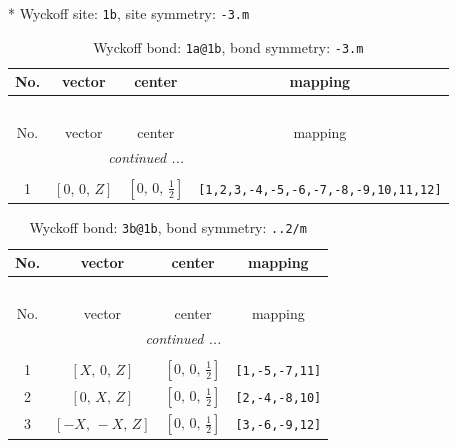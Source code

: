 \documentclass[fleqn,8pt]{jsarticle}
\begin{document}
* Wyckoff site: {\tt 1b}, site symmetry: {\tt -3.m}
\renewcommand{\arraystretch}{1.2}
\begin{longtable}{cccc}
\caption{Wyckoff bond: {\tt 1a@1b}, bond symmetry: {\tt -3.m}}
 \\
 \hline \hline
No. & vector & center & mapping \\ \hline \endfirsthead

\multicolumn{3}{l}{\tablename\ \thetable{}} \\
 \hline \hline
No. & vector & center & mapping \\ \hline \endhead

 \hline \hline
\multicolumn{3}{r}{\footnotesize\it continued ...} \\ \endfoot

 \hline \hline
\multicolumn{3}{r}{} \\ \endlastfoot

1 & $\left[ 0,\, 0,\, Z \right]$ & $\left[ 0,\, 0,\, \frac{1}{2} \right]$ & {\tt [1,2,3,-4,-5,-6,-7,-8,-9,10,11,12]} \\
\end{longtable}
\renewcommand{\arraystretch}{1.2}
\begin{longtable}{cccc}
\caption{Wyckoff bond: {\tt 3b@1b}, bond symmetry: {\tt ..2/m}}
 \\
 \hline \hline
No. & vector & center & mapping \\ \hline \endfirsthead

\multicolumn{3}{l}{\tablename\ \thetable{}} \\
 \hline \hline
No. & vector & center & mapping \\ \hline \endhead

 \hline \hline
\multicolumn{3}{r}{\footnotesize\it continued ...} \\ \endfoot

 \hline \hline
\multicolumn{3}{r}{} \\ \endlastfoot

1 & $\left[ X,\, 0,\, Z \right]$ & $\left[ 0,\, 0,\, \frac{1}{2} \right]$ & {\tt [1,-5,-7,11]} \\ \hline
2 & $\left[ 0,\, X,\, Z \right]$ & $\left[ 0,\, 0,\, \frac{1}{2} \right]$ & {\tt [2,-4,-8,10]} \\ \hline
3 & $\left[ - X,\, - X,\, Z \right]$ & $\left[ 0,\, 0,\, \frac{1}{2} \right]$ & {\tt [3,-6,-9,12]} \\
\end{longtable}
\renewcommand{\arraystretch}{1.2}
\end{document}
